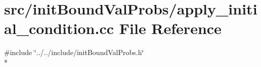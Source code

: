 \section{src/init\-Bound\-Val\-Probs/apply\-\_\-initial\-\_\-condition.cc File Reference}
\label{apply__initial__condition_8cc}
{\ttfamily \#include \char`\"{}../../include/init\-Bound\-Val\-Probs.\-h\char`\"{}}\\*
